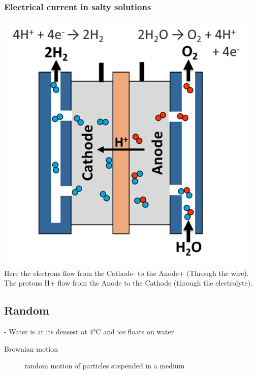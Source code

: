 \subsubsection{Electrical current in salty solutions}

\includegraphics{./includes/chemistry/imgs/electrolyzer.png}
\\
Here the electrons flow from the Cathode- to the Anode+ (Through the wire).\\
The protons H+ flow from the Anode to the Cathode (through the electrolyte).

\subsection{Random}
- Water is at its densest at 4°C and ice floats on water

\begin{description}
    \item[Brownian motion] random motion of particles suspended in a medium
\end{description}